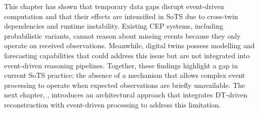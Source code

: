 This chapter has shown that temporary data gaps disrupt event-driven computation and that their effects are intensified in SoTS due to cross-twin dependencies and runtime instability. Existing CEP systems, including probabilistic variants, cannot reason about missing events because they only operate on received observations. Meanwhile, digital twins possess modelling and forecasting capabilities that could address this issue but are not integrated into event-driven reasoning pipelines. Together, these findings highlight a gap in current SoTS practice: the absence of a mechanism that allows complex event processing to operate when expected observations are briefly unavailable. The next chapter, , introduces an architectural approach that integrates DT-driven reconstruction with event-driven processing to address this limitation.
